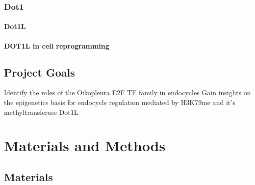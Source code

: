 \documentclass[11pt,twoside,a4paper]{report}
\begin{document}
		\subsection{Dot1}
			\subsubsection{Dot1L}
			\subsubsection{DOT1L in cell reprogramming}

	
	
	
	\section{Project Goals}
		Identify the roles of the Oikopleura E2F TF family in endocycles
		Gain insights on the epigenetics basis for endocycle regulation mediated by H3K79me and it's methyltransferase Dot1L

\clearpage

\chapter{Materials and Methods}
	\section{Materials}
\end{document}
